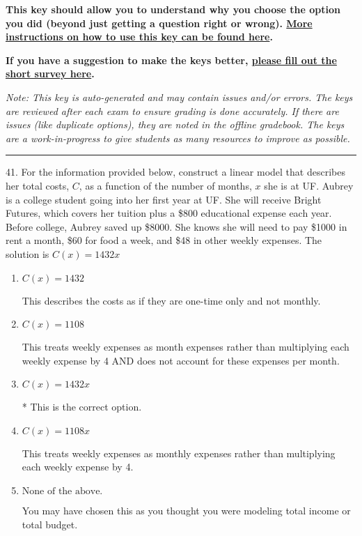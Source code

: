 \documentclass{extbook}[14pt]
\begin{document}
\textbf{This key should allow you to understand why you choose the option you did (beyond just getting a question right or wrong). \href{https://xronos.clas.ufl.edu/mac1105spring2020/courseDescriptionAndMisc/Exams/LearningFromResults}{More instructions on how to use this key can be found here}.}

\textbf{If you have a suggestion to make the keys better, \href{https://forms.gle/CZkbZmPbC9XALEE88}{please fill out the short survey here}.}

\textit{Note: This key is auto-generated and may contain issues and/or errors. The keys are reviewed after each exam to ensure grading is done accurately. If there are issues (like duplicate options), they are noted in the offline gradebook. The keys are a work-in-progress to give students as many resources to improve as possible.}

\rule{\textwidth}{0.4pt}

41. For the information provided below, construct a linear model that describes her total costs, $C$, as a function of the number of months, $x$ she is at UF. 
Aubrey is a college student going into her first year at UF. She will receive Bright Futures, which covers her tuition plus a \$800 educational expense each year. Before college, Aubrey saved up \$8000. She knows she will need to pay \$1000 in rent a month, \$60 for food a week, and \$48 in other weekly expenses. 
The solution is $ C(x) = 1432 x $ 

\begin{enumerate}[label=\Alph*.] 
\item $ C(x) = 1432 $ 

 This describes the costs as if they are one-time only and not monthly. 
\item $ C(x) = 1108 $ 

 This treats weekly expenses as month expenses rather than multiplying each weekly expense by 4 AND does not account for these expenses per month. 
\item $ C(x) = 1432 x $ 

 * This is the correct option. 
\item $ C(x) = 1108 x $ 

 This treats weekly expenses as monthly expenses rather than multiplying each weekly expense by 4. 
\item $ \text{None of the above.} $ 

 You may have chosen this as you thought you were modeling total income or total budget. 
\end{enumerate} 
 
\end{document}
